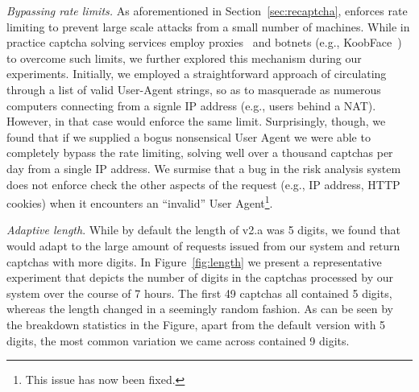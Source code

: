 \emph{Bypassing rate limits.} As aforementioned in Section~\ref{sec:recaptcha}, \re enforces 
rate limiting to prevent large scale attacks from a small number of machines. While in practice
captcha solving services employ proxies~\cite{captcha_proxies} and botnets (e.g., KoobFace~\cite{captcha_solvers}) 
to overcome such limits, we further explored this mechanism during our experiments. Initially,
we employed a straightforward approach of circulating through a list of valid User-Agent strings,
so as to masquerade as numerous computers connecting from a signle IP address (e.g., users behind a NAT).
However, in that case \re would enforce the same limit. Surprisingly, though, we found that if we 
supplied a bogus nonsensical User Agent we were able to completely bypass the rate limiting, solving 
well over a thousand captchas per day from a single IP address. We surmise that a bug in the risk analysis 
system does not enforce check the other aspects of the request (e.g., IP address, HTTP cookies) when 
it encounters an ``invalid'' User Agent\footnote{This issue has now been fixed.}.

\emph{Adaptive length}.
While by default the length of \re v2.a was 5 digits, we found %
that \re would adapt to the large amount of requests issued from our system and return captchas with more digits. 
In Figure~\ref{fig:length} we present a representative experiment that depicts the number of digits in the captchas
processed by our system over the course of 7 hours. The first 49 captchas all contained 5 digits, whereas the length
changed in a seemingly random fashion. As can be seen by the breakdown statistics in the Figure, apart from the default
version with 5 digits, the most common variation we came across contained 9 digits.

